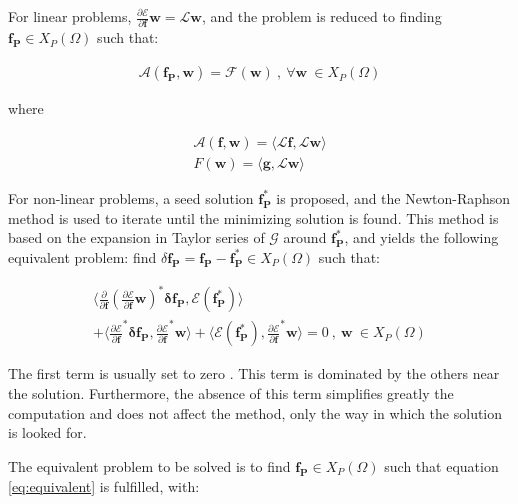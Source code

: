 \documentclass{CFD2011}
\begin{document}
For linear problems, $\frac{\partial\mathcal{E}}{\partial \mathbf{f}}\mathbf{w}=\mathcal{L}\mathbf{w}$, and the problem is reduced to finding $\mathbf{f_P} \in X_P(\Omega)$ such that:


\begin{eqnarray}
\mathcal{A}(\mathbf{f_P},\mathbf{w})=\mathcal{F}(\mathbf{w}) \ ,\ \forall \mathbf{w} \ \in X_P(\Omega)
\label{eq:equivalent}
\end{eqnarray}

\noindent where

\begin{eqnarray}
\mathcal{A}(\mathbf{f},\mathbf{w})= \langle \mathcal{L}\mathbf{f},\mathcal{L}\mathbf{w} \rangle \nonumber \\ 
F(\mathbf{w})= \langle \mathbf{g},\mathcal{L}\mathbf{w} \rangle 
\label{eq:equivLinear}
\end{eqnarray}




For non-linear problems, a seed solution $\mathbf{f^*_P}$ is proposed, and the Newton-Raphson method is used to iterate until the minimizing solution is found. This method is based on the expansion in Taylor series of $\mathcal{G}$ around $\mathbf{f^*_P}$, and yields the following equivalent problem: find $\delta\mathbf{f_P}=\mathbf{f_P}-\mathbf{f^*_P} \in X_P(\Omega)$ such that:

\begin{eqnarray}
\big\langle \frac{\partial}{\partial \mathbf{f}} \left(\frac{\partial\mathcal{E}}{\partial \mathbf{f}}\mathbf{w}\right)^*\mathbf{\delta f_P} , \mathcal{E}(\mathbf{f^*_P}) \big\rangle  \nonumber \\
+\big\langle \frac{\partial \mathcal{E}}{\partial \mathbf{f}}^*\mathbf{\delta f_P} , \frac{\partial \mathcal{E}}{\partial \mathbf{f}}^*\mathbf{w} \big\rangle +
\big\langle \mathcal{E}(\mathbf{f^*_P}) , \frac{\partial \mathcal{E}}{\partial \mathbf{f}}^*\mathbf{w} \big\rangle =0 \ ,\ \mathbf{w} \ \in X_P(\Omega)
\end{eqnarray}

The first term is usually set to zero \cite{Winterscheidt1994, Codd2001}. This term is dominated by the others near the solution. Furthermore, the absence of this term simplifies greatly the computation and does not affect the method, only the way in which the solution is looked for.

The equivalent problem to be solved is to find $\mathbf{f_P} \in X_P(\Omega)$ such that equation \ref{eq:equivalent} is fulfilled, with:
\end{document}
